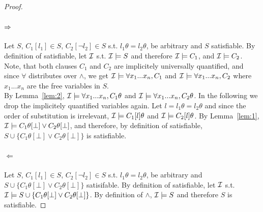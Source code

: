 \begin{proof}$ $
  \paragraph{$\Rightarrow$}
  Let $S$, $C_1[l_1] \in S$, $C_2[\neg l_2] \in S$ s.t. $l_1\theta = l_2\theta$, be arbitrary and $S$ satisfiable.
  By definition of satisfiable, let $\mathcal{I}$ s.t. $\mathcal{I} \models S$ and therefore $\mathcal{I} \models C_1$, and $\mathcal{I} \models C_2$.
  Note, that both clauses $C_1$ and $C_2$ are implicitely universally quantified, and since $\forall$ distributes over $\land$, we get $\mathcal{I} \models \forall x_1...x_n, C_1$ and $\mathcal{I} \models \forall x_1...x_n, C_2$ where $x_1...x_n$ are the free variables in $S$.\\
  By Lemma~\ref{lem:2}, $\mathcal{I} \models \forall x_1...x_n, C_1\theta$ and $\mathcal{I} \models \forall x_1...x_n, C_2\theta$. In the following we drop the implicitely quantified variables again. Let $l = l_1\theta = l_2\theta$ and since the order of substitution is irrelevant, $\mathcal{I} \models C_1[l]\theta$ and $\mathcal{I} \models C_2[l]\theta$. By Lemma~\ref{lem:1}, $\mathcal{I} \models C_1\theta[\bot] \vee C_2\theta[\bot]$, and therefore, by definition of satisfiable, $S \cup \{C_1\theta[\bot] \lor C_2\theta[\bot]\}$ is satisfiable.
  \paragraph{$\Leftarrow$}
  Let $S$, $C_1[l_1] \in S$, $C_2[\neg l_2] \in S$ s.t. $l_1\theta = l_2\theta$, be arbitrary and $S \cup \{C_1\theta[\bot] \lor C_2\theta[\bot]\}$ satisifable.
  By definition of satisfiable, let $\mathcal{I}$ s.t. $\mathcal{I} \models S \cup \{C_1\theta[\bot] \lor C_2\theta[\bot]\}$. By definition of $\land$, $\mathcal{I} \models S$ and therefore $S$ is satisfiable.
\end{proof}

